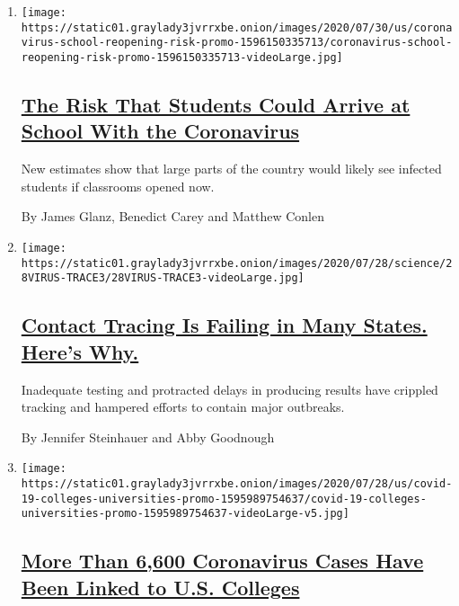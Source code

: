 \begin{enumerate}
\def\labelenumi{\arabic{enumi}.}
\item
  \texttt{[image: https://static01.graylady3jvrrxbe.onion/images/2020/07/30/us/coronavirus-school-reopening-risk-promo-1596150335713/coronavirus-school-reopening-risk-promo-1596150335713-videoLarge.jpg]}

  \hypertarget{the-risk-that-students-could-arrive-at-school-with-the-coronavirus}{%
  \subsection{\texorpdfstring{\href{/interactive/2020/07/31/us/coronavirus-school-reopening-risk.html}{The
  Risk That Students Could Arrive at School With the
  Coronavirus}}{The Risk That Students Could Arrive at School With the Coronavirus}}\label{the-risk-that-students-could-arrive-at-school-with-the-coronavirus}}

  New estimates show that large parts of the country would likely see
  infected students if classrooms opened now.

  By James Glanz, Benedict Carey and Matthew Conlen
\item
  \texttt{[image: https://static01.graylady3jvrrxbe.onion/images/2020/07/28/science/28VIRUS-TRACE3/28VIRUS-TRACE3-videoLarge.jpg]}

  \hypertarget{contact-tracing-is-failing-in-many-states-heres-why-1}{%
  \subsection{\texorpdfstring{\href{/2020/07/31/health/covid-contact-tracing-tests.html}{Contact
  Tracing Is Failing in Many States. Here's
  Why.}}{Contact Tracing Is Failing in Many States. Here's Why.}}\label{contact-tracing-is-failing-in-many-states-heres-why-1}}

  Inadequate testing and protracted delays in producing results have
  crippled tracking and hampered efforts to contain major outbreaks.

  By Jennifer Steinhauer and Abby Goodnough
\item
  \texttt{[image: https://static01.graylady3jvrrxbe.onion/images/2020/07/28/us/covid-19-colleges-universities-promo-1595989754637/covid-19-colleges-universities-promo-1595989754637-videoLarge-v5.jpg]}

  \hypertarget{more-than-6600-coronavirus-cases-have-been-linked-to-us-colleges}{%
  \subsection{\texorpdfstring{\href{/interactive/2020/07/28/us/covid-19-colleges-universities.html}{More
  Than 6,600 Coronavirus Cases Have Been Linked to U.S.
  Colleges}}{More Than 6,600 Coronavirus Cases Have Been Linked to U.S. Colleges}}\label{more-than-6600-coronavirus-cases-have-been-linked-to-us-colleges}}


\end{enumerate}
